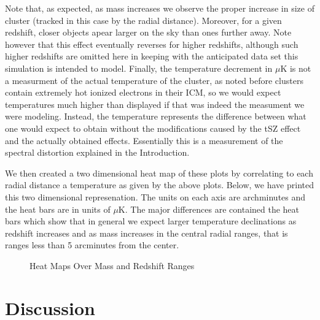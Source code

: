 \documentclass[12pt]{article} %
\begin{document}
Note that, as expected, as mass increases we observe the proper increase in size of cluster (tracked in this case by the radial distance). Moreover, for a given redshift, closer objects apear larger on the sky than ones further away. Note however that this effect eventually reverses for higher redshifts, although such higher redshifts are omitted here in keeping with the anticipated data set this simulation is intended to model. Finally, the temperature decrement in $\mu$K is not a measurment of the actual temperature of the cluster, as noted before clusters contain extremely hot ionized electrons in their ICM, so we would expect temperatures much higher than displayed if that was indeed the measument we were modeling. Instead, the temperature represents the difference between what one would expect to obtain without the modifications caused by the tSZ effect and the actually obtained effects. Essentially this is a measurement of the spectral distortion explained in the Introduction. 

We then created a two dimensional heat map of these plots by correlating to each radial distance a temperature as given by the above plots. Below, we have printed this two dimensional represenation. The units on each axis are archminutes and the heat bars are in units of $\mu$K. The major differences are contained the heat bars which show that in general we expect larger temperature declinations as redshift increases and as mass increases in the central radial ranges, that is ranges less than 5 arcminutes from the center. 

\begin{figure}[!ht]
    \hfill
    \hfill
    \vfill
    \hfill
    \hfill
    \vfill
    \hfill
    \hfill
    \caption{Heat Maps Over Mass and Redshift Ranges}
    \label{fig:dummy}
  \end{figure}

\section{Discussion}
\end{document}
